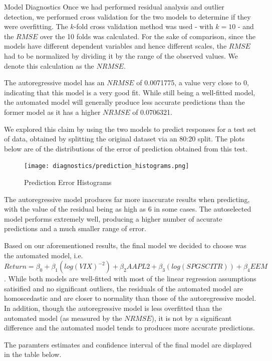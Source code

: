 \documentclass[]{article}
\begin{document}
\begin{section}{Model Diagnostics}
Once we had performed residual analysis and outlier detection, we performed cross validation for the two models to determine if they were overfitting. The $k$-fold cross validation method was used - with $k=10$ - and the $RMSE$ over the 10 folds was calculated. For the sake of comparison, since the models have different dependent variables and hence different scales, the $RMSE$ had to be normalized by dividing it by the range of the observed values. We denote this calculation as the $NRMSE$. 

The autoregressive model has an $NRMSE$ of 0.0071775, a value very close to 0, indicating that this model is a very good fit. While still being a well-fitted model, the automated model will generally produce less accurate predictions than the former model as it has a higher $NRMSE$ of 0.0706321.

We explored this claim by using the two models to predict responses for a test set of data, obtained by splitting the original dataset via an 80:20 split. The plots below are of the distributions of the error of prediction obtained from this test.

\begin{figure}[H]
  \centering
  \texttt{[image: diagnostics/prediction\_histograms.png]}
  \captionsetup{labelformat=empty}
  \caption{Prediction Error Histograms}
\end{figure}

The autoregressive model produces far more inaccurate results when predicting, with the value of the residual being as high as 6 in some cases. The autoselected model performs extremely well, producing a higher number of accurate predictions and a much smaller range of error.

Based on our aforementioned results, the final model we decided to choose was the automated model, i.e. $ Return = \beta_0 + \beta_1(log(VIX)^{-2}) + \beta_2AAPL2 + \beta_3(log(SPGSCITR)) + \beta_4EEM$. While both models are well-fitted with most of the linear regression assumptions satisified and no significant outliers, the residuals of the automated model are homoscedastic and are closer to normality than those of the autoregressive model. In addition, though the autoregressive model is less overfitted than the automated model (as measured by the $NRMSE$), it is not by a significant difference and the automated model tends to produces more accurate predictions. 

The paramters estimates and confidence interval of the final model are displayed in the table below.


\end{section}
\end{document}
